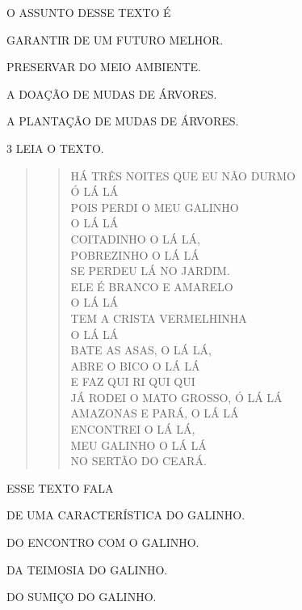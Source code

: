 
O ASSUNTO DESSE TEXTO É

\begin{escolha}
\item GARANTIR DE UM FUTURO MELHOR.

\item PRESERVAR DO MEIO AMBIENTE.

\item A DOAÇÃO DE MUDAS DE ÁRVORES.

\item A PLANTAÇÃO DE MUDAS DE ÁRVORES.
\end{escolha}

\num{3} LEIA O TEXTO.

\begin{quote}
\begin{verse}
HÁ TRÊS NOITES QUE EU NÃO DURMO\\
Ó LÁ LÁ\\
POIS PERDI O MEU GALINHO\\
O LÁ LÁ\\
COITADINHO O LÁ LÁ,\\
POBREZINHO O LÁ LÁ\\
SE PERDEU LÁ NO JARDIM.\\
ELE É BRANCO E AMARELO\\
O LÁ LÁ\\
TEM A CRISTA VERMELHINHA\\
O LÁ LÁ\\
BATE AS ASAS, O LÁ LÁ,\\
ABRE O BICO O LÁ LÁ\\
E FAZ QUI RI QUI QUI\\
JÁ RODEI O MATO GROSSO, Ó LÁ LÁ\\
AMAZONAS E PARÁ, O LÁ LÁ\\
ENCONTREI O LÁ LÁ,\\
MEU GALINHO O LÁ LÁ\\
NO SERTÃO DO CEARÁ.
\end{verse}

\end{quote}

ESSE TEXTO FALA

\begin{escolha}
\item DE UMA CARACTERÍSTICA DO GALINHO.

\item DO ENCONTRO COM O GALINHO.

\item DA TEIMOSIA DO GALINHO.

\item DO SUMIÇO DO GALINHO.
\end{escolha}

